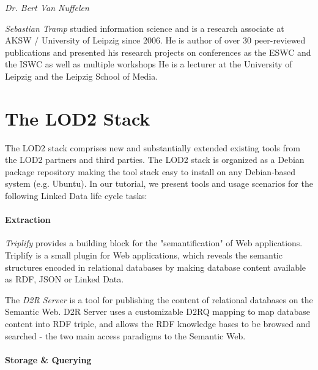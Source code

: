 \documentclass[a4paper, 11pt]{llncs}
\begin{document}
\emph{Dr. Bert Van Nuffelen} 

\emph{Sebastian Tramp} studied information science and is a research associate at AKSW / University of Leipzig since 2006.
He is author of over 30 peer-reviewed publications and presented his research projects on conferences as the ESWC and the ISWC as well as multiple workshops
He is a lecturer at the University of Leipzig and the Leipzig School of Media.

    
\section{The LOD2 Stack}
\label{sec:stack}

The LOD2 stack comprises new and substantially extended existing tools from the LOD2 partners and third parties.
The LOD2 stack is organized as a Debian package repository making the tool stack easy to install on any Debian-based system (e.g. Ubuntu).
In our tutorial, we present tools and usage scenarios for the following Linked Data life cycle tasks:

\paragraph{Extraction}

\emph{Triplify} \cite{triplify_www} provides a building block for the "semantification" of Web applications.
Triplify is a small plugin for Web applications, which reveals the semantic structures encoded in relational databases by making database content available as RDF, JSON or Linked Data.

The \emph{D2R Server} \cite{d2rposter} is a tool for publishing the content of relational databases on the Semantic Web.
D2R Server uses a customizable D2RQ mapping to map database content into RDF triple, and allows the RDF knowledge bases to be browsed and searched - the two main access paradigms to the Semantic Web.

\paragraph{Storage \& Querying}
\end{document}
